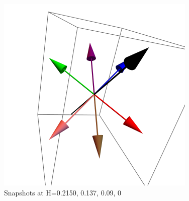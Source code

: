 \documentclass{article}
\begin{document}
\begin{figure}[ht]
\includegraphics[scale=0.37]{HVariedData/Pictures/101Dec216.png}
\caption{Snapshots at H=0.2150, 0.137, 0.09, 0}
\end{figure}
\end{document}
